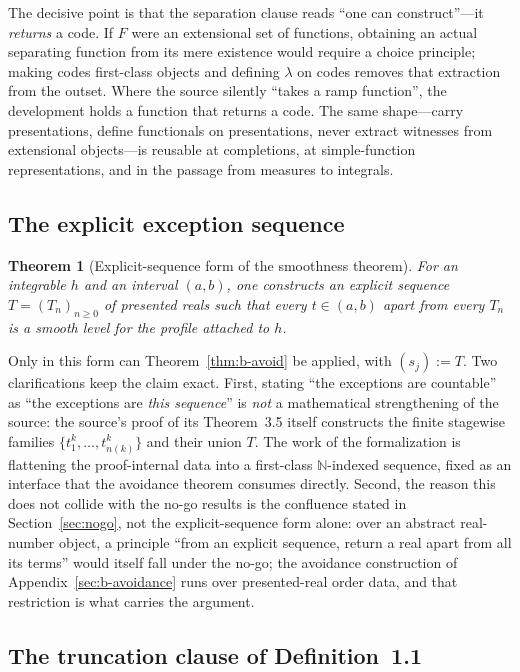 \documentclass[11pt]{article}
\newtheorem{theorem}{Theorem}[section]
\theoremstyle{definition}
\theoremstyle{remark}
\begin{document}
The decisive point is that the separation clause reads ``one can construct''---it \emph{returns} a code.  If $F$ were an extensional set of functions, obtaining an actual separating function from its mere existence would require a choice principle; making codes first-class objects and defining $\lambda$ on codes removes that extraction from the outset.  Where the source silently ``takes a ramp function'', the development holds a function that returns a code.  The same shape---carry presentations, define functionals on presentations, never extract witnesses from extensional objects---is reusable at completions, at simple-function representations, and in the passage from measures to integrals.

\subsection{The explicit exception sequence}
\label{sec:b-exception}

\begin{theorem}[Explicit-sequence form of the smoothness theorem]
\label{thm:b-exception}
For an integrable $h$ and an interval $(a,b)$, one constructs an \emph{explicit sequence} $T=(T_n)_{n\ge0}$ of presented reals such that every $t\in(a,b)$ apart from every $T_n$ is a smooth level for the profile attached to $h$.
\end{theorem}

Only in this form can Theorem~\ref{thm:b-avoid} be applied, with $(s_j):=T$.  Two clarifications keep the claim exact.  First, stating ``the exceptions are countable'' as ``the exceptions are \emph{this sequence}'' is \emph{not} a mathematical strengthening of the source: the source's proof of its Theorem~3.5 itself constructs the finite stagewise families $\{t^k_1,\dots,t^k_{n(k)}\}$ and their union $T$.  The work of the formalization is flattening the proof-internal data into a first-class $\mathbb{N}$-indexed sequence, fixed as an interface that the avoidance theorem consumes directly.  Second, the reason this does not collide with the no-go results is the confluence stated in Section~\ref{sec:nogo}, not the explicit-sequence form alone: over an abstract real-number object, a principle ``from an explicit sequence, return a real apart from all its terms'' would itself fall under the no-go; the avoidance construction of Appendix~\ref{sec:b-avoidance} runs over presented-real order data, and that restriction is what carries the argument.

\subsection{The truncation clause of Definition~1.1}
\label{sec:b-truncation}
\end{document}
